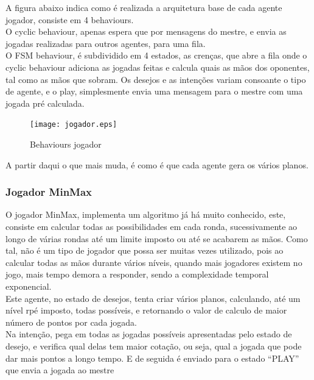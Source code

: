 \documentclass[12pt]{article}
\begin{document}
    
    A figura abaixo indica como é realizada a arquitetura base de cada agente jogador, consiste em 4 behaviours.\\
    O cyclic behaviour, apenas espera que por mensagens do mestre, e envia as jogadas realizadas para outros agentes, para uma fila.\\
    O FSM behaviour, é subdividido em 4 estados, as crenças, que abre a fila onde o cyclic behaviour adiciona as jogadas feitas e calcula quais as mãos dos oponentes, tal como as mãos que sobram. Os desejos e as intenções variam consoante o tipo de agente, e o play, simplesmente envia uma mensagem para o mestre com uma jogada pré calculada.\\

    \begin{figure}[h]
		\centering
        \texttt{[image: jogador.eps]}
		\caption{Behaviours jogador}
		\label{fig:jogador}
	\end{figure}
	
	A partir daqui o que mais muda, é como é que cada agente gera os vários planos.
	
	\subsubsection*{Jogador MinMax}
	O jogador MinMax, implementa um algoritmo já há muito conhecido, este, consiste em calcular todas as possibilidades em cada ronda, sucessivamente ao longo de várias rondas até um limite imposto ou até se acabarem as mãos. Como tal, não é um tipo de jogador que possa ser muitas vezes utilizado, pois ao calcular todas as mãos durante vários níveis, quando mais jogadores existem no jogo, mais tempo demora a responder, sendo a complexidade temporal exponencial.\\
    Este agente, no estado de desejos, tenta criar vários planos, calculando, até um nível rpé imposto, todas possíveis, e retornando o valor de calculo de maior número de pontos por cada jogada.\\
    Na intenção, pega em todas as jogadas possíveis apresentadas pelo estado de desejo, e verifica qual delas tem maior cotação, ou seja, qual a jogada que pode dar mais pontos a longo tempo. E de seguida é enviado para o estado “PLAY” que envia a jogada ao mestre
\end{document}
